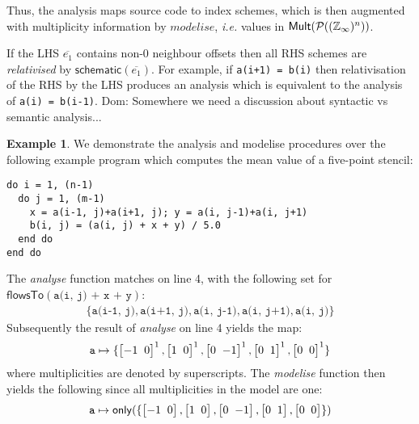 \documentclass[10pt,preprint]{sigplanconf}
\newcommand{\dnote}[1]{\textcolor{darkpurple}{Dom: #1}}
\newcounter{block}
\theoremstyle{definition}
\newtheorem{example}[block]{Example}
\newcommand{\ie}{\emph{i.e.}}
\newcommand{\vtwoh}[2]{\setlength{\arraycolsep}{0em}
\left[\begin{array}{cc}#1 \; & \; #2\end{array}\right]}
\begin{document}
Thus, the analysis maps source code to index schemes, which is then
augmented with multiplicity information by $\mathit{modelise}$,
\ie{} values in $\mathsf{Mult}(\mathcal{P}((\mathbb{Z}_\infty{})^n))$.

If the LHS $\overline{e_1}$ contains non-$0$ neighbour offsets
then all RHS schemes are \emph{relativised} by
$\textsf{schematic}(\overline{e_1})$. For example,
if \texttt{a(i+1) = b(i)} then relativisation of the RHS by the LHS
produces an analysis which is equivalent to the analysis of \texttt{a(i) = b(i-1)}.
\dnote{Somewhere we need a discussion about syntactic vs semantic
analysis...}


\begin{example}
\label{exm:checking}
We demonstrate the analysis and modelise procedures over the
following example program which computes the mean value
of a five-point stencil:
\begin{verbatim}
do i = 1, (n-1)
  do j = 1, (m-1)
    x = a(i-1, j)+a(i+1, j); y = a(i, j-1)+a(i, j+1)
    b(i, j) = (a(i, j) + x + y) / 5.0
  end do
end do
\end{verbatim}
%
The \textit{analyse} function matches on
line 4, with the following set for $\textsf{flowsTo}(\texttt{a(i, j) + x +
  y})$:
%
\begin{align*}
\{\texttt{a(i-1, j)}, \texttt{a(i+1, j)}, \texttt{a(i, j-1)},
  \texttt{a(i, j+1)}, \texttt{a(i, j)}\}
\end{align*}
Subsequently the result of \textit{analyse} on line 4 yields the map:
\begin{align*}
\texttt{a} \mapsto \{\vtwoh{-1}{0}^1, \vtwoh{1}{0}^1,
          \vtwoh{0}{-1}^1, \vtwoh{0}{1}^1, \vtwoh{0}{0}^1\}
\end{align*}
%
where multiplicities are denoted by superscripts. The \emph{modelise}
function then yields the following since all multiplicities in the model are one:
\begin{align*}
\texttt{a} \mapsto \mathsf{only}(\{\vtwoh{-1}{0}, \vtwoh{1}{0},
          \vtwoh{0}{-1}, \vtwoh{0}{1}, \vtwoh{0}{0}\})
\end{align*}
\end{example}


%
\end{document}
